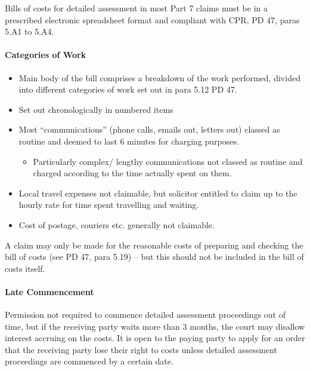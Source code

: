\documentclass[
]{article}
\providecommand{\tightlist}{%
  \setlength{\itemsep}{0pt}\setlength{\parskip}{0pt}}
\begin{document}
Bills of costs for detailed assessment in most Part 7 claims must be in
a prescribed electronic spreadsheet format and compliant with CPR, PD
47, paras 5.A1 to 5.A4.

\hypertarget{categories-of-work}{%
\paragraph{Categories of Work}\label{categories-of-work}}

\begin{itemize}
\tightlist
\item
  Main body of the bill comprises a breakdown of the work performed,
  divided into different categories of work set out in para 5.12 PD 47.
\item
  Set out chronologically in numbered items
\item
  Most ``communications'' (phone calls, emails out, letters out) classed
  as routine and deemed to last 6 minutes for charging purposes.

  \begin{itemize}
  \tightlist
  \item
    Particularly complex/ lengthy communications not classed as routine
    and charged according to the time actually spent on them.
  \end{itemize}
\item
  Local travel expenses not claimable, but solicitor entitled to claim
  up to the hourly rate for time spent travelling and waiting.
\item
  Cost of postage, couriers etc. generally not claimable.
\end{itemize}

A claim may only be made for the reasonable costs of preparing and
checking the bill of costs (see PD 47, para 5.19) -- but this should not
be included in the bill of costs itself.

\hypertarget{late-commencement}{%
\paragraph{Late Commencement}\label{late-commencement}}

Permission not required to commence detailed assessment proceedings out
of time, but if the receiving party waits more than 3 months, the court
may disallow interest accruing on the costs. It is open to the paying
party to apply for an order that the receiving party lose their right to
costs unless detailed assessment proceedings are commenced by a certain
date.
\end{document}
